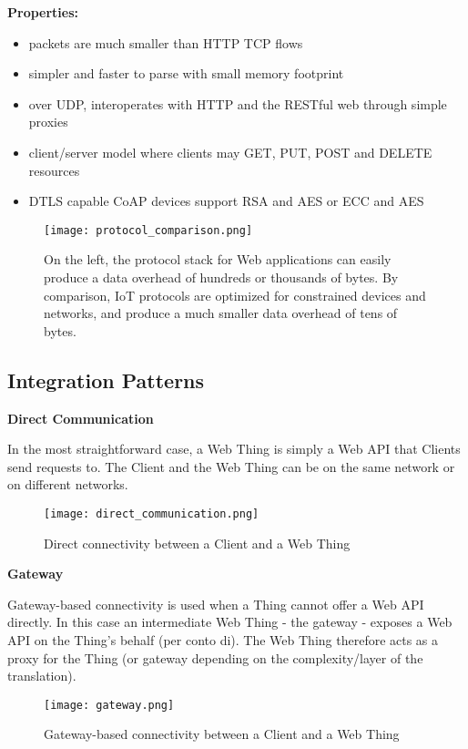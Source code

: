 \textbf{Properties:}

\begin{itemize}
    \item packets are much smaller than HTTP TCP flows
    \item simpler and faster to parse with small memory footprint
    \item over UDP, interoperates with HTTP and the RESTful web through simple
proxies
    \item client/server model where clients may GET, PUT, POST and DELETE
resources
    \item DTLS capable CoAP devices support RSA and AES or ECC and AES
\end{itemize}

\begin{figure}[H]
  \centering
  \texttt{[image: protocol\_comparison.png]}
  \caption{On the left, the protocol stack for Web applications can easily
produce a data overhead of hundreds or thousands of bytes.
By comparison, IoT protocols are optimized for constrained devices and
networks, and produce a much smaller data overhead of tens of bytes.}
  \label{fig:protocol_comparison}
\end{figure}

\subsection{Integration Patterns}

\textbf{Direct Communication}

In the most straightforward case, a Web Thing is simply a Web API that Clients
send requests to.
The Client and the Web Thing can be on the same network or on different
networks.

\begin{figure}[H]
  \centering
  \texttt{[image: direct\_communication.png]}
  \caption{Direct connectivity between a Client and a Web Thing}
  \label{fig:direct_communication}
\end{figure}

\textbf{Gateway}

Gateway-based connectivity is used when a Thing cannot offer a Web API directly.
In this case an intermediate Web Thing - the gateway - exposes a Web API on the
Thing's behalf (per conto di).
The Web Thing therefore acts as a proxy for the Thing (or gateway depending on
the complexity/layer of the translation).

\begin{figure}[H]
  \centering
  \texttt{[image: gateway.png]}
  \caption{Gateway-based connectivity between a Client and a Web Thing}
  \label{fig:gateway}
\end{figure}

